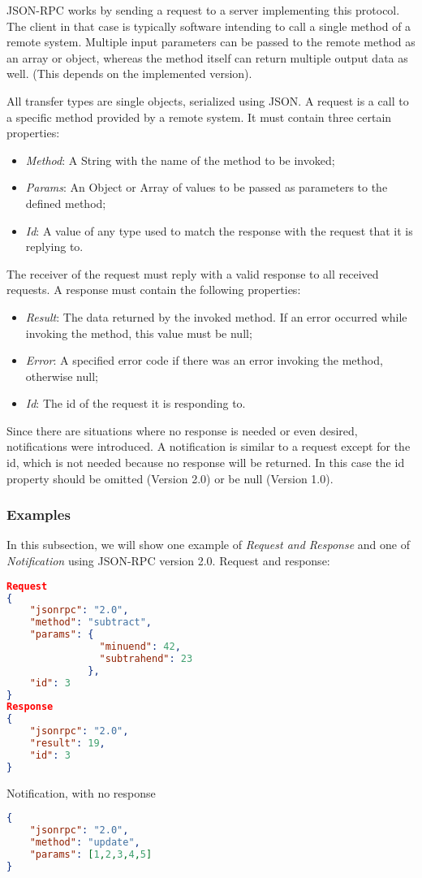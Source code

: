 JSON-RPC works by sending a request to a server implementing this protocol. The client in that case is typically software intending to call a single method of a remote system. Multiple input parameters can be passed to the remote method as an array or object, whereas the method itself can return multiple output data as well. (This depends on the implemented version).

All transfer types are single objects, serialized using JSON. A request is a call to a specific method provided by a remote system. It must contain three certain properties:
\begin{itemize}
    \item \textit{Method}: A String with the name of the method to be invoked;
    \item \textit{Params}: An Object or Array of values to be passed as parameters to the defined method;
    \item \textit{Id}: A value of any type used to match the response with the request that it is replying to.
\end{itemize}

The receiver of the request must reply with a valid response to all received requests. A response must contain the following properties:
\begin{itemize}
    \item \textit{Result}: The data returned by the invoked method. If an error occurred while invoking the method, this value must be null;
    \item \textit{Error}: A specified error code if there was an error invoking the method, otherwise null;
    \item \textit{Id}: The id of the request it is responding to.
\end{itemize}
Since there are situations where no response is needed or even desired, notifications were introduced. A notification is similar to a request except for the id, which is not needed because no response will be returned. In this case the id property should be omitted (Version 2.0) or be null (Version 1.0).
\subsubsection{Examples}
In this subsection, we will show one example of \textit{Request and Response} and one of \textit{Notification} using JSON-RPC version 2.0.
\newline
Request and response:
\begin{lstlisting}[language=json]
Request
{
    "jsonrpc": "2.0", 
    "method": "subtract", 
    "params": {
                "minuend": 42, 
                "subtrahend": 23
              },
    "id": 3
}
Response 
{
    "jsonrpc": "2.0", 
    "result": 19, 
    "id": 3
}
\end{lstlisting}
Notification, with no response
\begin{lstlisting}[language=json]
{
    "jsonrpc": "2.0",
    "method": "update",
    "params": [1,2,3,4,5]
}
\end{lstlisting}

